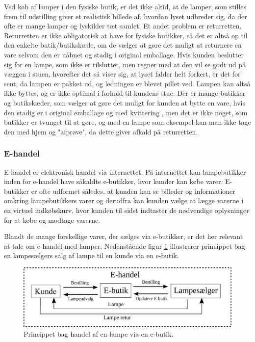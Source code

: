 Ved køb af lamper i den fysiske butik, er det ikke altid, at de lamper, som stilles frem til udstilling giver et realistisk billede af, hvordan lyset udbreder sig, da der ofte er mange lamper og lyskilder tæt samlet. Et andet problem er returretten. Returretten er ikke obligatorisk at have for fysiske butikker, så det er altså op til den enkelte butik/butikskæde, om de vælger at gøre det muligt at returnere en vare selvom den er uåbnet og stadig i original emballage\cite{fortrydelsesret}. Hvis kunden beslutter sig for en lampe, som ikke er tilsluttet, men regner med at den vil se godt ud på væggen i stuen, hvorefter det så viser sig, at lyset falder helt forkert, er det for sent, da lampen er pakket ud, og ledningen er blevet pillet ved. Lampen kan altså ikke byttes, og er ikke optimal i forhold til kundens stue. Der er mange butikker og butikskæder, som vælger at gøre det muligt for kunden at bytte en vare, hvis den stadig er i original emballage og med kvittering \cite{ikea_returret}, men det er ikke noget, som butikker er tvunget til at gøre, og med en lampe som eksempel kan man ikke tage den med hjem og "afprøve", da dette giver afkald på returretten.

\subsubsection{E-handel}
\label{sec:ehandel}
E-handel er elektronisk handel via internettet\cite{ddo_ehandel}. På internettet kan lampebutikker inden for e-handel have såkaldte e-butikker, hvor kunder kan købe varer\cite{ddo_ebutik}. E-butikker er ofte udformet således, at kunden kan se billeder og informationer omkring lampebutikkers varer og derudfra kan kunden vælge at lægge varerne i en virtuel indkøbskurv, hvor kunden til sidst indtaster de nødvendige oplysninger for at købe og modtage varerne.

Blandt de mange forskellige varer, der sælges via e-butikker, er det her relevant at tale om e-handel med lamper. Nedenstående figur \ref{fig:e_handel_med_lamper} illustrerer princippet bag en lampesælgers salg af lampe til en kunde via en e-butik.

\begin{figure}[H]
	\includegraphics{e_handel_med_lampe}
	\caption{Princippet bag handel af en lampe via en e-butik.}
    \label{fig:e_handel_med_lamper}
\end{figure}

